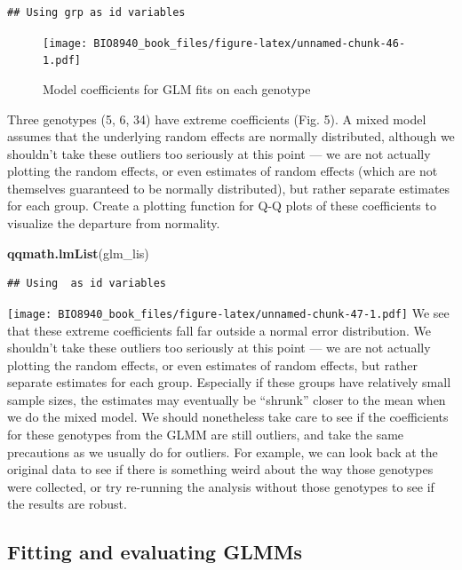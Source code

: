 \documentclass[
  12pt,
]{book}
\newenvironment{Shaded}{\begin{snugshade}}{\end{snugshade}}
\newcommand{\KeywordTok}[1]{\textcolor[rgb]{0.13,0.29,0.53}{\textbf{#1}}}
\newcommand{\NormalTok}[1]{#1}
\begin{document}
\begin{verbatim}
## Using grp as id variables
\end{verbatim}

\begin{figure}
\centering
\texttt{[image: BIO8940\_book\_files/figure-latex/unnamed-chunk-46-1.pdf]}
\caption{\label{fig:unnamed-chunk-46}Model coefficients for GLM fits on each genotype}
\end{figure}

Three genotypes (5, 6, 34) have extreme coefficients (Fig. 5). A mixed model assumes that the underlying random effects are normally distributed, although we shouldn't take these outliers too seriously at this point --- we are not actually plotting the random effects, or even estimates of random effects (which are not themselves guaranteed to be normally distributed), but rather separate estimates for each group.
Create a plotting function for Q-Q plots of these coefficients to visualize the departure from normality.

\begin{Shaded}
\begin{Highlighting}[]
\KeywordTok{qqmath.lmList}\NormalTok{(glm_lis)}
\end{Highlighting}
\end{Shaded}

\begin{verbatim}
## Using  as id variables
\end{verbatim}

\texttt{[image: BIO8940\_book\_files/figure-latex/unnamed-chunk-47-1.pdf]}
We see that these extreme coefficients fall far outside a normal error distribution. We shouldn't take these outliers too seriously at this point --- we are not actually plotting the random effects, or even estimates of random effects, but rather separate estimates for each group.
Especially if these groups have relatively small sample sizes, the estimates may eventually be ``shrunk'' closer to the mean when we do the mixed model.
We should nonetheless take care to see if the coefficients for these genotypes from the GLMM are still outliers, and take the same precautions as we usually do for outliers. For example, we can look back at the original data to see if there is something weird about the way those genotypes were collected, or try re-running the analysis without those genotypes to see if the results are robust.

\hypertarget{fitting-and-evaluating-glmms}{%
\subsection{Fitting and evaluating GLMMs}\label{fitting-and-evaluating-glmms}}
\end{document}
